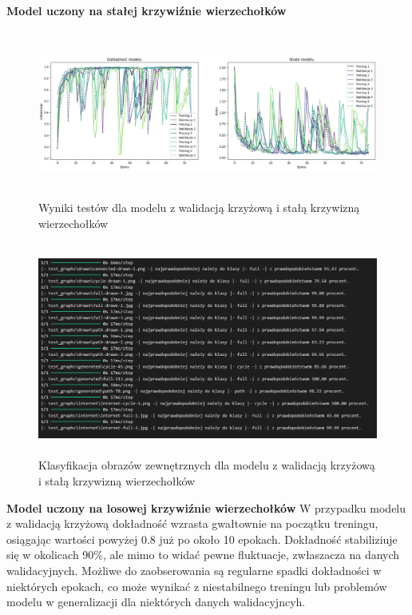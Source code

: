 \textbf{Model uczony na stałej krzywiźnie wierzechołków}

\begin{figure}[ht]
	\centering
	\includegraphics[height=5.5cm]{resources/tests/images/v2/crossvalid_img.png}
	\caption{Wyniki testów dla modelu z walidacją krzyżową i stałą krzywizną wierzechołków}
	\label{Fig:tests-cv-1}
\end{figure}
\FloatBarrier

\begin{figure}[ht]
	\centering
	\includegraphics[height=7cm]{resources/tests/images/v2/crossvalid_txt.png}
	\caption{Klasyfikacja obrazów zewnętrznych dla modelu z walidacją krzyżową i stałą krzywizną wierzechołków}
	\label{Fig:tests-cv-2}
\end{figure}
\FloatBarrier

\textbf{Model uczony na losowej krzywiźnie wierzechołków}
W przypadku modelu z walidacją krzyżową dokładność wzrasta gwałtownie na początku treningu,
osiągając wartości powyżej 0.8 już po około 10 epokach.
Dokładność stabiliziuje się w okolicach 90\%, ale mimo to widać pewne fluktuacje, zwłaszacza na danych walidacyjnych.
Możliwe do zaobserowania są regularne spadki dokładności w niektórych epokach,
co może wynikać z niestabilnego treningu lub problemów modelu w generalizacji dla niektórych danych walidacyjncyh.

